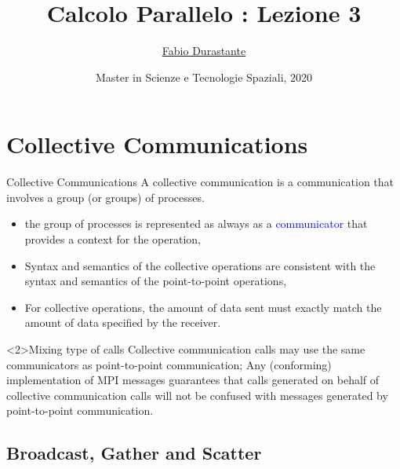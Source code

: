 \documentclass[xcolor={svgnames,usenames}]{beamer}
\title[Calcolo Parallelo]{Calcolo Parallelo : Lezione 3}
\author[F. Durastante]{
    \href{mailto:f.durastante@na.iac.cnr.it}{Fabio Durastante}
}
\institute{Consiglio Nazionale delle Ricerche - Istituto per Le Applicazioni del Calcolo ``M. Picone''}
\date[Gennaio 2020]{Master in Scienze e Tecnologie Spaziali, 2020}
\begin{document}
\begin{frame}
	\titlepage
\end{frame}

\section[Outline]{}
\frame{\tableofcontents}

\section{Collective Communications}

\begin{frame}{Collective Communications}
	A \alert{collective communication} is a communication that involves a group (or groups) of
	processes.
	\begin{itemize}
		\item the group of processes is represented as always as a \textcolor{blue}{communicator} that provides a context for the operation,
		\item Syntax and semantics of the collective
		operations are consistent with the syntax and semantics of the point-to-point
		operations,
		\item For collective operations, the amount of data sent \alert{must exactly match} the amount of data specified by
		the receiver.
	\end{itemize}
	\vfill
	\begin{block}{Mixing type of calls}
	Collective communication calls may use the same communicators as point-to-point
	communication; Any (conforming) implementation of MPI messages guarantees that calls  generated on behalf of collective communication calls will not be confused with messages generated by point-to-point communication.
	\end{block}
\end{frame}

\subsection{Broadcast, Gather and Scatter}
\end{document}
